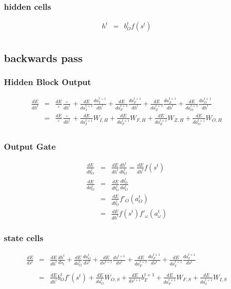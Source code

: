 \documentclass{article}
\begin{document}
\subsubsection{hidden cells}
\begin{eqnarray*}
h^t &=& b_{O}^t f(s^t) \\
\end{eqnarray*}


\subsection{backwards pass}

\subsubsection{Hidden Block Output}
\begin{eqnarray*}
\frac{dE}{dh^t} &=& \frac{dE}{ \circ }\frac{ \circ }{dh^t} + \frac{dE}{da_{I}^{t+1}}\frac{da_{I}^{t+1}}{dh^t} + \frac{dE}{da_{F}^{t+1}}\frac{da_{F}^{t+1}}{dh^{t}} + \frac{dE}{da_{Z}^{t+1}}\frac{da_{Z}^{t+1}}{dh^t} + \frac{dE}{da_{O}^{t+1}}\frac{da_{O}^{t+1}}{dh^t} \\
 &=& \frac{dE}{\circ}\frac{\circ}{dh^t} + \frac{dE}{da_{I}^{t+1}}W_{I,H} + \frac{dE}{da_{F}^{t+1}}W_{F,H} + \frac{dE}{da_{Z}^{t+1}}W_{Z,H} + \frac{dE}{da_{O}^{t+1}}W_{O,H} \\
\end{eqnarray*}

\subsubsection{Output Gate}
\begin{eqnarray*}
\frac{dE}{db_{O}^t} &=& \frac{dE}{dh^t}\frac{dh^t}{db_{O}^t} = \frac{dE}{dh^t}f(s^t) \\ 
\frac{dE}{da_{O}^t} &=& \frac{dE}{db_{O}^t}\frac{db_{O}^t}{da_{O}^t} \\
&=& \frac{dE}{db_{O}^t}f'_{O}(a_{O}^t) \\
&=& \frac{dE}{dh^t}f(s^t)f'_{\omega}(a_{\omega}^t) 
\end{eqnarray*}

\subsubsection{state cells}
\begin{eqnarray*}
\frac{dE}{ds^t}&=&\frac{dE}{dh^t}\frac{dh^t}{ds_t} + \frac{dE}{da_{O}^t}\frac{da_{O}^t}{ds^t}+\frac{dE}{ds^{t+1}}\frac{ds^{t+1}}{ds^t}+\frac{dE}{da_{F}^{t+1}}\frac{da_{F}^{t+1}}{ds^t} + \frac{dE}{da_{I}^{t+1}}\frac{da_{I}^{t+1}}{ds^t}\\ \\
&=& \frac{dE}{dh^t}b_{O}^tf'(s^t)+ \frac{dE}{da_{O}^t}W_{O,S} + \frac{dE}{ds^{t+1}}b_{F}^{t+1} + \frac{dE}{da_{F}^{t+1}}W_{F,S} + \frac{dE}{da_{I}^{t+1}}W_{I,S} \\
\end{eqnarray*}
\end{document}

